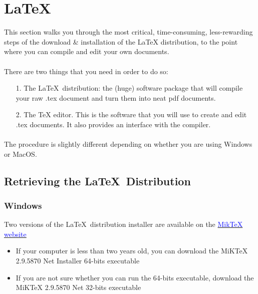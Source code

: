 
\section{\LaTeX\ }


This section walks you through the most critical, time-consuming, less-rewarding steps of  the download \& installation of the LaTeX distribution, to the point where you can compile and edit your own documents. 
\paragraph{}
There are two things that you need in order to do so:
\begin{itemize}
\item[1.] The \LaTeX\ distribution: the (huge) software package that will compile your raw .tex document and turn them into  neat pdf documents.
\item[2.]  The TeX editor. This is the software that you will use to create and edit .tex documents. It also provides an interface with the compiler.
\end{itemize}
\paragraph{}
The procedure is slightly different depending on whether you are using Windows or MacOS.

\subsection{Retrieving the \LaTeX\ Distribution }

\subsubsection*{Windows}
Two versions of the \LaTeX\ distribution installer are available on the  \href{http://www.miktex.org/download
}{\textcolor{blue}{MikTeX website}}



\begin{itemize}
\item If your computer is less than two years old,
you can download the MiKTeX 2.9.5870 Net Installer 64-bits executable
\item If you are not sure whether you can run the 64-bits executable, 
download the MiKTeX 2.9.5870 Net 32-bits executable 
\end{itemize}


